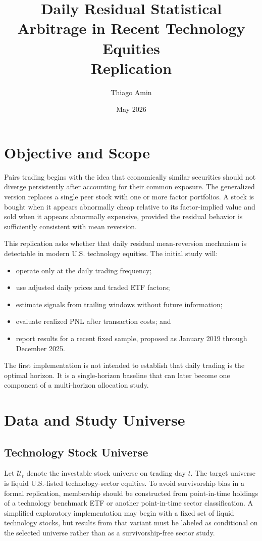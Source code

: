 \documentclass[11pt]{article}
\title{Daily Residual Statistical Arbitrage in Recent Technology Equities\\
Replication}
\author{Thiago Amin}
\date{May 2026}
\begin{document}
\maketitle

\section{Objective and Scope}

Pairs trading begins with the idea that economically similar securities should
not diverge persistently after accounting for their common exposure. The
generalized version replaces a single peer stock with one or more factor
portfolios. A stock is bought when it appears abnormally cheap relative to its
factor-implied value and sold when it appears abnormally expensive, provided
the residual behavior is sufficiently consistent with mean reversion.

This replication asks whether that daily residual mean-reversion mechanism is
detectable in modern U.S. technology equities. The initial study will:
\begin{itemize}
    \item operate only at the daily trading frequency;
    \item use adjusted daily prices and traded ETF factors;
    \item estimate signals from trailing windows without future information;
    \item evaluate realized PNL after transaction costs; and
    \item report results for a recent fixed sample, proposed as January 2019
    through December 2025.
\end{itemize}

The first implementation is not intended to establish that daily trading is
the optimal horizon. It is a single-horizon baseline that can later become one
component of a multi-horizon allocation study.

\section{Data and Study Universe}

\subsection{Technology Stock Universe}

Let $\mathcal{U}_t$ denote the investable stock universe on trading day $t$.
The target universe is liquid U.S.-listed technology-sector equities. To avoid
survivorship bias in a formal replication, membership should be constructed
from point-in-time holdings of a technology benchmark ETF or another
point-in-time sector classification. A simplified exploratory implementation
may begin with a fixed set of liquid technology stocks, but results from that
variant must be labeled as conditional on the selected universe rather than as
a survivorship-free sector study.
\end{document}
